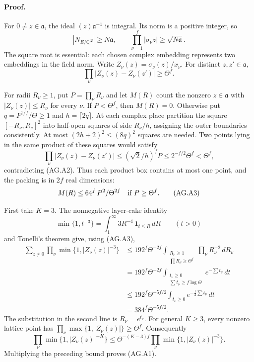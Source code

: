 \documentclass[11pt,a4paper]{article}
\numberwithin{equation}{section}
\theoremstyle{remark}\newtheorem{remark}[theorem]{Remark}
\begin{document}
\paragraph{Proof.}
For \(0\ne z\in\mathfrak a\), the ideal
\((z)\mathfrak a^{-1}\) is integral.  Its norm is a positive
integer, so
\[
 |N_{E/\mathbb Q}z|\ge N\mathfrak a,\qquad
 \prod_{\nu=1}^{f}|\sigma_\nu z|\ge\sqrt{N\mathfrak a}.
\]
The square root is essential: each chosen complex embedding
represents two embeddings in the field norm.
Write \(Z_\nu(z)=\sigma_\nu(z)/x_\nu\).
For distinct \(z,z'\in\mathfrak a\),
\[
 \prod_\nu|Z_\nu(z)-Z_\nu(z')|\ge\Theta^f.                 \tag{AG.A2}
\]

For radii \(R_\nu\ge1\), put \(P=\prod_\nu R_\nu\) and let
\(M(R)\) count the nonzero \(z\in\mathfrak a\) with
\(|Z_\nu(z)|\le R_\nu\) for every \(\nu\).
If \(P<\Theta^f\), then \(M(R)=0\).
Otherwise put \(q=P^{1/f}/\Theta\ge1\) and
\(h=\lceil2q\rceil\).
At each complex place partition the square
\([-R_\nu,R_\nu]^2\) into half-open squares of side \(R_\nu/h\),
assigning the outer boundaries consistently.
At most \((2h+2)^2\le(8q)^2\) squares are needed.
Two points lying in the same product of these squares would
satisfy
\[
 \prod_\nu|Z_\nu(z)-Z_\nu(z')|
 \le(\sqrt2/h)^fP
 \le 2^{-f/2}\Theta^f<\Theta^f,
\]
contradicting (AG.A2).  Thus each product box contains at most
one point, and the packing is in \(2f\) real dimensions:
\[
 M(R)\le64^f\,P^2/\Theta^{2f}
       \quad\hbox{if }P\ge\Theta^f.                        \tag{AG.A3}
\]

First take \(K=3\).  The nonnegative layer-cake identity
\[
 \min\{1,t^{-3}\}=\int_1^\infty 3R^{-4}\,
                                      \mathbf1_{t\le R}\,dR
 \qquad(t>0)
\]
and Tonelli's theorem give, using (AG.A3),
\begin{align*}
 \sum_{z\ne0}\prod_\nu\min\{1,|Z_\nu(z)|^{-3}\}
 &\le 192^f\Theta^{-2f}
 \int_{\substack{R_\nu\ge1\\\prod R_\nu\ge\Theta^f}}
                         \prod_\nu R_\nu^{-2}\,dR_\nu\\
 &=192^f\Theta^{-2f}
 \int_{\substack{t_\nu\ge0\\\sum t_\nu\ge f\log\Theta}}
                            e^{-\sum t_\nu}\,dt\\
 &\le192^f\Theta^{-5f/2}
       \int_{t_\nu\ge0}e^{-\frac12\sum t_\nu}\,dt\\
 &=384^f\Theta^{-5f/2}.
\end{align*}
The substitution in the second line is \(R_\nu=e^{t_\nu}\).
For general \(K\ge3\), every nonzero lattice point has
\(\prod_\nu\max\{1,|Z_\nu(z)|\}\ge\Theta^f\).  Consequently
\[
 \prod_\nu\min\{1,|Z_\nu(z)|^{-K}\}
 \le \Theta^{-(K-3)f}
                   \prod_\nu\min\{1,|Z_\nu(z)|^{-3}\}.
\]
Multiplying the preceding bound proves (AG.A1).
\end{document}
